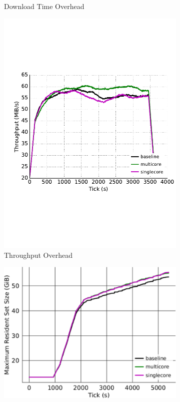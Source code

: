 \begin{figure}
\begin{subfigure}[t]{0.32\textwidth}
		\caption{Download Time Overhead}
		\label{fig:overhead_ttlastbyte}
	\end{subfigure}
	\begin{subfigure}[t]{0.32\textwidth} \centering
\includegraphics[trim={0 3cm 0 3cm}, clip, width=1.0\textwidth]{images/overhead_throughput.pdf}
		\caption{Throughput Overhead}
		\label{fig:overhead_throughput}
	\end{subfigure}
	\begin{subfigure}[t]{0.32\textwidth} \centering
\includegraphics[trim={0 3cm 0 3cm}, clip, width=1.0\textwidth]{images/overhead_memory.pdf}

\end{subfigure}
\end{figure}
